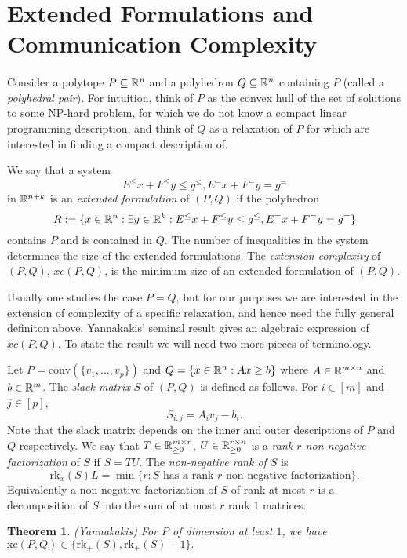 \documentclass[letterpaper,12pt,oneside,onecolumn]{article}
\newtheorem{theorem}[fact]{Theorem}
\begin{document}
\section{Extended Formulations and Communication Complexity}
\paragraph{}
Consider a polytope $P\subseteq \mathbb{R}^n$ and a polyhedron $Q\subseteq \mathbb{R}^n$ containing $P$ (called a \emph{polyhedral pair}). For intuition, think of $P$ as the convex hull of the set of solutions to some NP-hard problem, for which we do not know a compact linear programming description, and think of $Q$ as a relaxation of $P$ for which are interested in finding a compact description of.

We say that a system 
$$E^\leq x + F^\leq y \leq g^\leq, E^= x + F^= y = g^=$$
in $\mathbb{R}^{n+k}$ is an \emph{extended formulation} of $(P,Q)$ if the polyhedron
$$R:=\{x \in \mathbb{R}^n: \exists y \in \mathbb{R}^k: E^\leq x + F^\leq y \leq g^\leq, E^= x + F^= y = g^=\}$$
contains $P$ and is contained in $Q$. The number of inequalities in the system determines the size of the extended formulations. The \emph{extension complexity} of $(P,Q)$, $xc(P,Q)$, is the minimum size of an extended formulation of $(P,Q)$.

Usually one studies the case $P=Q$, but for our purposes we are interested in the extension of complexity of a specific relaxation, and hence need the fully general definiton above. Yannakakis' seminal result \cite{yannakakis1991expressing} gives an algebraic expression of $xc(P,Q)$. To state the result we will need two more pieces of terminology.

Let $P = \text{conv}(\{v_1,\dots,v_p\})$ and $Q = \{x\in \mathbb{R}^n: Ax\geq b\}$ where $A \in \mathbb{R}^{m \times n}$ and $b \in \mathbb{R}^m$. The \emph{slack matrix} $S$ of $(P,Q)$ is defined as follows. For $i \in[m]$ and $j \in [p]$,
$$S_{i,j} = A_iv_j - b_i.$$
Note that the slack matrix depends on the inner and outer descriptions of $P$ and $Q$ respectively. We say that $T\in \mathbb{R}^{m\times r}_{\geq 0}$, $U \in \mathbb{R}^{r\times n}_{\geq 0}$ is a \emph {rank $r$ non-negative factorization} of $S$ if $S = TU$. The \emph{non-negative rank of $S$} is 
$$\text{rk}_x(S) L= \min\{r: S \text{ has a rank $r$ non-negative factorization}\}.$$ 
Equivalently a non-negative factorization of $S$ of rank at most $r$ is a decomposition of $S$ into the sum of at most $r$ rank $1$ matrices.
\begin{theorem}
    (Yannakakis) For $P$ of dimension at least $1$, we have $\text{xc}(P,Q) \in \{\text{rk}_+(S), \text{rk}_+(S) - 1\}.$
\end{theorem}
\end{document}
